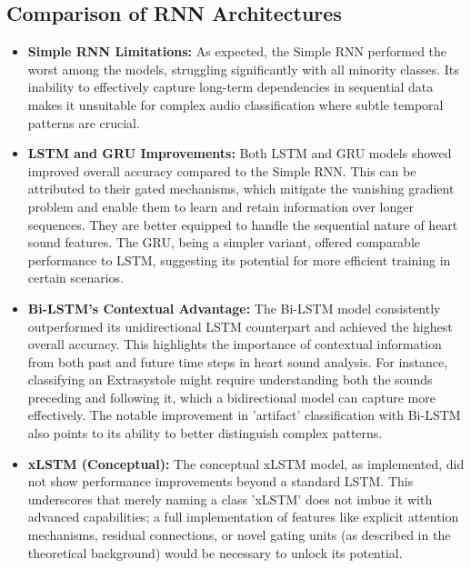 \documentclass[a4paper]{article}
\begin{document}
\begin{multicols}{2}
\subsection{Comparison of RNN Architectures}
\begin{itemize}
    \item \textbf{Simple RNN Limitations:} As expected, the Simple RNN performed the worst among the models, struggling significantly with all minority classes. Its inability to effectively capture long-term dependencies in sequential data makes it unsuitable for complex audio classification where subtle temporal patterns are crucial.
    \item \textbf{LSTM and GRU Improvements:} Both LSTM and GRU models showed improved overall accuracy compared to the Simple RNN. This can be attributed to their gated mechanisms, which mitigate the vanishing gradient problem and enable them to learn and retain information over longer sequences. They are better equipped to handle the sequential nature of heart sound features. The GRU, being a simpler variant, offered comparable performance to LSTM, suggesting its potential for more efficient training in certain scenarios.
    \item \textbf{Bi-LSTM's Contextual Advantage:} The Bi-LSTM model consistently outperformed its unidirectional LSTM counterpart and achieved the highest overall accuracy. This highlights the importance of contextual information from both past and future time steps in heart sound analysis. For instance, classifying an Extrasystole might require understanding both the sounds preceding and following it, which a bidirectional model can capture more effectively. The notable improvement in 'artifact' classification with Bi-LSTM also points to its ability to better distinguish complex patterns.
    \item \textbf{xLSTM (Conceptual):} The conceptual xLSTM model, as implemented, did not show performance improvements beyond a standard LSTM. This underscores that merely naming a class 'xLSTM' does not imbue it with advanced capabilities; a full implementation of features like explicit attention mechanisms, residual connections, or novel gating units (as described in the theoretical background) would be necessary to unlock its potential.
\end{itemize}


\end{multicols}
\end{document}
